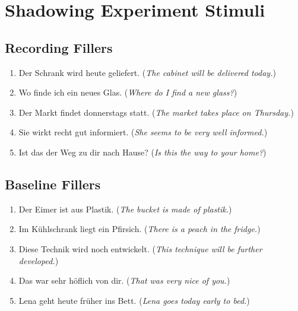 \chapter{Shadowing Experiment Stimuli}
\label{app:shadow_experiment_stimul}

\section*{Recording Fillers}
\begin{enumerate}
	\item Der Schrank wird heute geliefert. (\textit{The cabinet will be delivered today.})
	\item Wo finde ich ein neues Glas. (\textit{Where do I find a new glass?})
	\item Der Markt findet donnerstags statt. (\textit{The market takes place on Thursday.})
	\item Sie wirkt recht gut informiert. (\textit{She seems to be very well informed.})
	\item Ist das der Weg zu dir nach Hause? (\textit{Is this the way to your home?})
\end{enumerate}

\section*{Baseline Fillers}
\begin{enumerate}[resume]
	\item Der Eimer ist aus Plastik. (\textit{The bucket is made of plastik.})
	\item Im Kühlschrank liegt ein Pfirsich. (\textit{There is a peach in the fridge.})
	\item Diese Technik wird noch entwickelt. (\textit{This technique will be further developed.})
	\item Das war sehr höflich von dir. (\textit{That was very nice of you.})
	\item Lena geht heute früher ins Bett. (\textit{Lena goes today early to bed.})
\end{enumerate}

